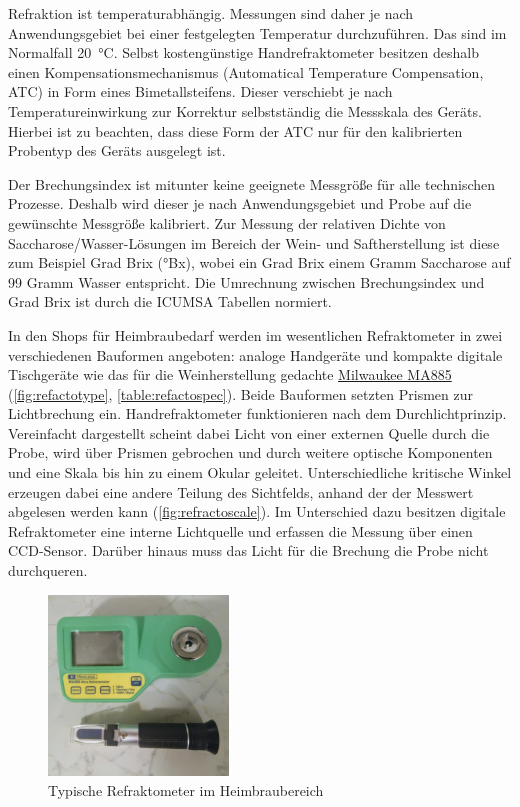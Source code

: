 \documentclass[a4paper,parskip=half]{scrartcl}
\begin{document}
Refraktion ist temperaturabhängig. Messungen sind daher je nach
Anwendungsgebiet bei einer festgelegten Temperatur durchzuführen.
Das sind im Normalfall 20~°C. Selbst kostengünstige Handrefraktometer
besitzen deshalb einen Kompensationsmechanismus (Automatical Temperature
Compensation, ATC) in Form eines Bimetallsteifens. Dieser 
verschiebt je nach Temperatureinwirkung zur Korrektur selbstständig
die Messskala des Geräts. Hierbei ist zu beachten, dass diese Form der
ATC nur für den kalibrierten Probentyp des Geräts ausgelegt ist.
\autocite{Depalma2017,Distillique2020,Gossett2012,Terrill2013}

Der Brechungsindex ist mitunter keine geeignete Messgröße für alle
technischen Prozesse. Deshalb wird dieser je nach Anwendungsgebiet
und Probe auf die gewünschte Messgröße kalibriert. Zur Messung
der relativen Dichte von Saccharose/Wasser-Lösungen im Bereich der
Wein- und Saftherstellung ist diese zum Beispiel Grad Brix (°Bx), wobei
ein Grad Brix einem Gramm Saccharose auf 99 Gramm Wasser entspricht. Die
Umrechnung zwischen Brechungsindex und Grad Brix ist durch die ICUMSA
Tabellen normiert.
\autocite{Bonham2001,Terrill2013}

In den Shops für Heimbraubedarf werden im wesentlichen Refraktometer in
zwei verschiedenen Bauformen angeboten: analoge Handgeräte
und kompakte digitale Tischgeräte wie das für die Weinherstellung
gedachte \href{https://milwaukeeinstruments.eu/milwaukee-ma885-digital-brix-oechsle-oe-and-kmw-babo-refractometer/}{Milwaukee MA885} (\autoref{fig:refactotype},
\autoref{table:refactospec}). Beide Bauformen setzten Prismen zur
Lichtbrechung ein. Handrefraktometer funktionieren
nach dem Durchlichtprinzip. Vereinfacht dargestellt scheint dabei Licht
von einer externen Quelle durch die Probe, wird über Prismen gebrochen
und durch weitere optische Komponenten und eine Skala bis hin zu einem
Okular geleitet. Unterschiedliche kritische Winkel erzeugen dabei eine
andere Teilung des Sichtfelds, anhand der der Messwert abgelesen werden
kann (\autoref{fig:refractoscale}). Im Unterschied dazu besitzen
digitale Refraktometer eine interne Lichtquelle und erfassen die
Messung über einen CCD-Sensor. Darüber hinaus muss das Licht für
die Brechung die Probe nicht durchqueren. \autocite{AKRSSOGH2021,Gamer1959,Terrill2013}
 
\begin{figure}[h]
\centering
\includegraphics[width=4.8cm]{images/types.jpg}
\caption{Typische Refraktometer im Heimbraubereich}
\label{fig:refactotype}
\end{figure}
\end{document}
